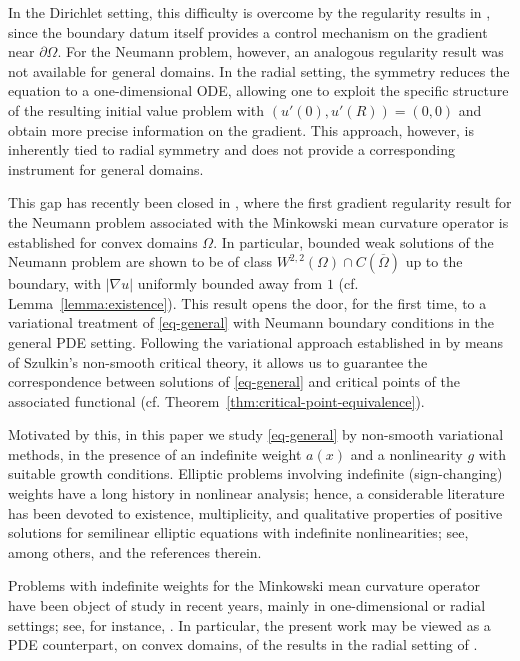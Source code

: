 \documentclass[11pt,reqno]{amsart}
\theoremstyle{plain}
\theoremstyle{definition}
\numberwithin{equation}{section}
\begin{document}
In the Dirichlet setting, this difficulty is overcome by the regularity results in \cite{BaSi82}, since the boundary datum itself provides a control mechanism on the gradient near $\partial\Omega$. For the Neumann problem, however, an analogous regularity result was not available for general domains. In the radial setting, the symmetry reduces the equation to a one-dimensional ODE, allowing one to exploit the specific structure of the resulting initial value problem with $(u'(0),u'(R))=(0,0)$ and obtain more precise information on the gradient. This approach, however, is inherently tied to radial symmetry and does not provide a corresponding instrument for general domains.

This gap has recently been closed in \cite{Ma26}, where the first gradient regularity result for the Neumann problem associated with the Minkowski mean curvature operator is established for convex domains $\Omega$. In particular, bounded weak solutions of the Neumann problem are shown to be of class $W^{2,2}(\Omega)\cap C(\overline{\Omega})$ up to the boundary, with $|\nabla u|$ uniformly bounded away from $1$ (cf. Lemma~\ref{lemma:existence}). This result opens the door, for the first time, to a variational treatment of \eqref{eq-general} with Neumann boundary conditions in the general PDE setting. Following the variational approach established in \cite{BeJeMa14} by means of Szulkin's non-smooth critical theory, it allows us to guarantee the correspondence between solutions of \eqref{eq-general} and critical points of the associated functional (cf. Theorem~\ref{thm:critical-point-equivalence}).

Motivated by this, in this paper we study \eqref{eq-general} by non-smooth variational methods, in the presence of an indefinite weight $a(x)$ and a nonlinearity $g$ with suitable growth conditions. Elliptic problems involving indefinite (sign-changing) weights have a long history in nonlinear analysis; hence, a considerable literature has been devoted to existence, multiplicity, and qualitative properties of positive solutions for semilinear elliptic equations with indefinite nonlinearities; see, among others, \cite{HeKa80,BCN95,AlTa96,AmLo98} and the references therein.

Problems with indefinite weights for the Minkowski mean curvature operator have been object of study in recent years, mainly in one-dimensional or radial settings; see, for instance, \cite{BoFe20,BoFe202,BoFeZa16,BoFeZa23}. In particular, the present work may be viewed as a PDE counterpart, on convex domains, of the results in the radial setting of \cite{BoFe202,BoFe20}.
\end{document}
